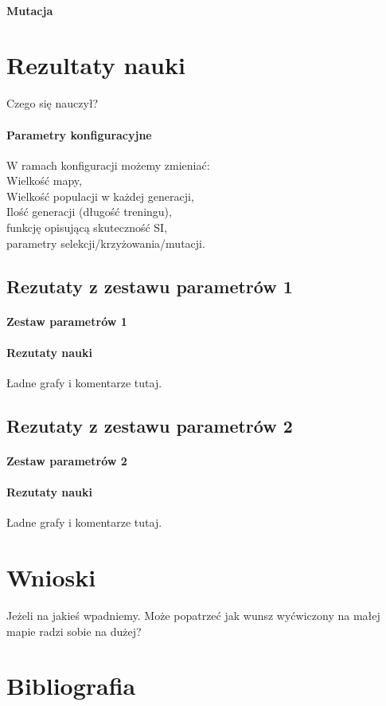 \documentclass{article}
\begin{document}
\paragraph{Mutacja}
\section{Rezultaty nauki}
Czego się nauczył?
\paragraph{Parametry konfiguracyjne}
W ramach konfiguracji możemy zmieniać: \\
Wielkość mapy, \\
Wielkość populacji w każdej generacji, \\
Ilość generacji (długość treningu), \\
funkcję opisującą skuteczność SI, \\
parametry selekcji/krzyżowania/mutacji.
\subsection{Rezutaty z zestawu parametrów 1}
\paragraph{Zestaw parametrów 1}
\paragraph{Rezutaty nauki}
Ładne grafy i komentarze tutaj.
\subsection{Rezutaty z zestawu parametrów 2}
\paragraph{Zestaw parametrów 2}
\paragraph{Rezutaty nauki}
Ładne grafy i komentarze tutaj.
\section{Wnioski} 
Jeżeli na jakieś wpadniemy.
Może popatrzeć jak wunsz wyćwiczony na małej mapie radzi sobie na dużej?
\section{Bibliografia}
\end{document}
